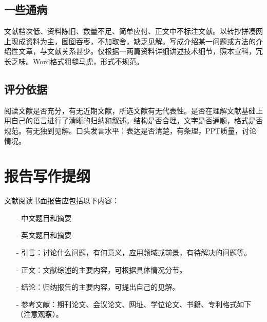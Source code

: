     \subsection{一些通病}
        文献档次低、资料陈旧、数量不足、简单应付、正文中不标注文献。以转抄拼凑网上现成资料为主，囫囵吞枣，不加取舍，缺乏见解。写成介绍某一问题或方法的介绍性文章，与文献关系甚少。仅根据一两篇资料详细讲述技术细节，照本宣科，冗长乏味。Word格式粗糙马虎，形式不规范。

    \subsection{评分依据}
        阅读文献是否充分，有无近期文献，所选文献有无代表性。是否在理解文献基础上用自己的语言进行了清晰的归纳和叙述。结构是否合理，文字是否通顺，格式是否规范。有无独到见解。口头发言水平：表达是否清楚，有条理，PPT质量，讨论情况。
        
\section{报告写作提纲}
    文献阅读书面报告应包括以下内容：
    \begin{itemize}
        \item[-] 中文题目和摘要
        \item[-] 英文题目和摘要
        \item[-] 引言：讨论什么问题，有何意义，应用领域或前景，有待解决的问题等。
        \item[-] 正文：文献综述的主要内容，可根据具体情况分节。
        \item[-] 结论：归纳报告的主要内容，可提出自己的见解。
        \item[-] 参考文献：期刊论文、会议论文、网址、学位论文、书籍、专利格式如下（注意观察）。
    \end{itemize}



















